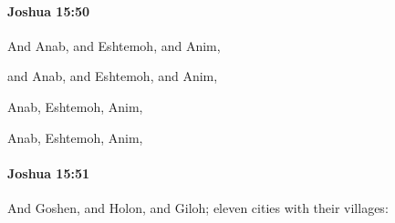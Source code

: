 		\paragraph{Joshua 15:50} %
			\label{JOSHUA-15-50}

			And Anab, and Eshtemoh, and Anim,

			\begin{versebox}
					\item[BHS] 
					\item[ASV] and Anab, and Eshtemoh, and Anim,
					\item[NIV] Anab, Eshtemoh, Anim,
					\item[NRSV] Anab, Eshtemoh, Anim,
			\end{versebox}

		\paragraph{Joshua 15:51} %
			\label{JOSHUA-15-51}

			And Goshen, and Holon, and Giloh; eleven cities with their villages:

